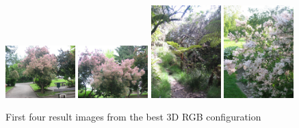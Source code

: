 \documentclass[12pt]{article}
\begin{document}
\begin{itemize}
\begin{figure}[H]
	\centering
	\includegraphics[width=0.24\textwidth]{hvUYrvNcps.jpg}
	\includegraphics[width=0.24\textwidth]{qRsMWVmGMO.jpg}
	\includegraphics[width=0.24\textwidth]{VhIqjAUdMe.jpg}
	\includegraphics[width=0.24\textwidth]{FZRgQsGBCM.jpg}
	\caption{First four result images from the best 3D RGB configuration}
\end{figure}


\end{itemize}
\end{document}
